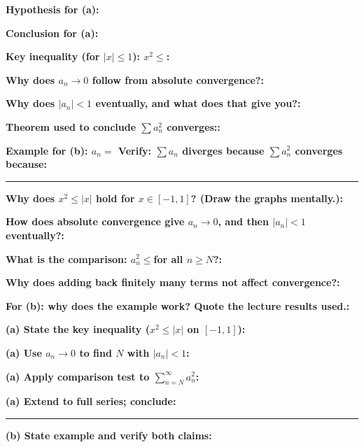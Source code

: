 \documentclass[12pt]{article}
\newcommand{\fillfield}[1]{%
  \par\noindent\textbf{#1:}\enspace\hrulefill\par\vspace{3pt}%
}
\newcommand{\fillfieldlong}[1]{%
  \par\noindent\textbf{#1:}\par\vspace{1.5cm}%
  \noindent\rule{\linewidth}{0.35pt}\par\vspace{4pt}%
}
\newcommand{\writespace}[1]{\vspace{#1}}
\begin{document}
\bigskip

\begin{tcolorbox}[
  enhanced, breakable,
  colback  = pass2yellow,
  colframe = yellow!65!black,
  fonttitle = \bfseries,
  title = {Pass 2 \enspace\textbf{--}\enspace Proof Recipe Card}
]
\fillfield{Hypothesis for (a)}
\fillfield{Conclusion for (a)}
\fillfield{Key inequality (for $|x| \leq 1$): $x^2 \leq$}
\fillfield{Why does $a_n \to 0$ follow from absolute convergence?}
\fillfield{Why does $|a_n| < 1$ eventually, and what does that give you?}
\fillfield{Theorem used to conclude $\sum a_n^2$ converges:}
\fillfieldlong{Example for (b): $a_n =$\hspace{1cm} Verify: $\sum a_n$ diverges because\hspace{0.5cm} $\sum a_n^2$ converges because}
\end{tcolorbox}

\bigskip

\begin{tcolorbox}[
  enhanced, breakable,
  colback  = pass3orange,
  colframe = orange!65!black,
  fonttitle = \bfseries,
  title = {Pass 3 \enspace\textbf{--}\enspace Self-Explanation}
]
\fillfield{Why does $x^2 \leq |x|$ hold for $x \in [-1,1]$? (Draw the graphs mentally.)}
\fillfield{How does absolute convergence give $a_n \to 0$, and then $|a_n| < 1$ eventually?}
\fillfield{What is the comparison: $a_n^2 \leq$\enspace\hrulefill for all $n \geq N$?}
\fillfield{Why does adding back finitely many terms not affect convergence?}
\fillfield{For (b): why does the example work? Quote the lecture results used.}
\end{tcolorbox}

\newpage

\begin{tcolorbox}[
  enhanced, breakable,
  colback  = pass4purple,
  colframe = purple!55!black,
  fonttitle = \bfseries,
  title = {Pass 4 \enspace\textbf{--}\enspace Skeleton Proof}
]
\noindent\textbf{(a) State the key inequality ($x^2 \leq |x|$ on $[-1,1]$):}\par
\writespace{1.2cm}

\noindent\textbf{(a) Use $a_n \to 0$ to find $N$ with $|a_n| < 1$:}\par
\writespace{1.6cm}

\noindent\textbf{(a) Apply comparison test to $\sum_{n=N}^{\infty} a_n^2$:}\par
\writespace{1.6cm}

\noindent\textbf{(a) Extend to full series; conclude:}\par
\writespace{1.2cm}

\noindent\rule{\linewidth}{0.4pt}\vspace{2pt}

\noindent\textbf{(b) State example and verify both claims:}\par
\writespace{2.0cm}
\end{tcolorbox}
\end{document}
